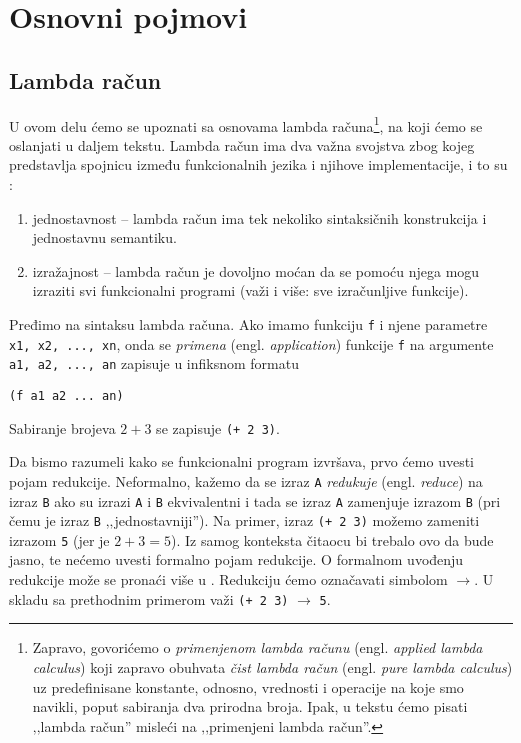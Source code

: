\section{Osnovni pojmovi}
\label{sec:osnovni pojmovi}

\subsection{Lambda račun}
\label{subsec:lambda racun}

U ovom delu ćemo se upoznati sa osnovama lambda računa\footnote{Zapravo, govorićemo o \textit{primenjenom lambda računu} (engl. \textit{applied lambda calculus}) koji zapravo obuhvata \textit{čist lambda račun} (engl. \textit{pure lambda calculus}) uz predefinisane konstante, odnosno, vrednosti i operacije na koje smo navikli, poput sabiranja dva prirodna broja. Ipak, u tekstu ćemo pisati ‚‚lambda račun'' misleći na ‚‚primenjeni lambda račun''.}, na koji ćemo se oslanjati u daljem tekstu. Lambda račun ima dva važna svojstva zbog kojeg predstavlja spojnicu između funkcionalnih jezika i njihove implementacije, i to su \cite{the-implementation-of-functional-programming-languages}:
\begin{enumerate}
	\item jednostavnost -- lambda račun ima tek nekoliko sintaksičnih konstrukcija i jednostavnu semantiku.
	\item izražajnost -- lambda račun je dovoljno moćan da se pomoću njega mogu izraziti svi funkcionalni programi (važi i više: sve izračunljive funkcije).
\end{enumerate}

Pređimo na sintaksu lambda računa. Ako imamo funkciju \verb|f| i njene parametre \verb|x1, x2, ..., xn|, onda se \textit{primena} (engl. \textit{application}) funkcije \verb|f| na argumente \verb|a1, a2, ..., an| zapisuje u infiksnom formatu
\begin{center}
	\verb|(f a1 a2 ... an)|
\end{center}

\begin{primer}
	Sabiranje brojeva $2+3$ se zapisuje \verb|(+ 2 3)|.
\end{primer}

Da bismo razumeli kako se funkcionalni program izvršava, prvo ćemo uvesti pojam redukcije. Neformalno, kažemo da se izraz \verb|A| \textit{redukuje} (engl. \textit{reduce}) na izraz \verb|B| ako su izrazi \verb|A| i \verb|B| ekvivalentni i tada se izraz \verb|A| zamenjuje izrazom \verb|B| (pri čemu je izraz \verb|B| ‚‚jednostavniji''). Na primer, izraz \verb|(+ 2 3)| možemo zameniti izrazom \verb|5| (jer je $2+3=5$). Iz samog konteksta čitaocu bi trebalo ovo da bude jasno, te nećemo uvesti formalno pojam redukcije. O formalnom uvođenju redukcije može se pronaći više u \cite{foundations-of-functional-programming}. Redukciju ćemo označavati simbolom $\rightarrow$. U skladu sa prethodnim primerom važi \verb|(+ 2 3)| $\rightarrow$ \verb|5|.

